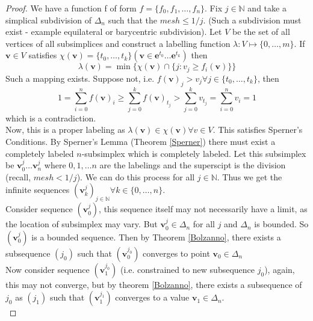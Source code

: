 \documentclass{article}
\theoremstyle{definition}
\begin{document}
\begin{proof}
We have a function f of form $f = \{f_0,f_1,\dots, f_n\}$. Fix $j \in \mathbb{N}$ and take a simplical subdivision of $\Delta_n$ such that the $mesh \leq 1/j$. (Such a subdivision must exist - example equilateral or barycentric subdivision). Let $V$ be the set of all vertices of all subsimplices and construct a labelling function $\lambda: V\mapsto \{0,\dots,m\}$. If $\mathbf{v} \in V$ satisfies $\chi(\mathbf{v}) = \{t_0,\dots, t_k\} (\mathbf{v} \in \mathbf{e}^{t_0}\dots \mathbf{e}^{t_k})$ then $$\lambda(\mathbf{v}) = \min\{\chi(\mathbf{v}) \cap \{j: v_j \geq f_i(\mathbf{v})\} \}$$ Such a mapping exists. Suppose not, i.e. $f(\mathbf{v})_j > v_j \forall j\in\{t_0,\dots, t_k\}$, then $$1 = \sum_{i=0}^n f(\mathbf{v})_i \geq \sum_{j=0}^k f(\mathbf{v})_{t_j} > \sum_{j=0}^k v_{t_j} = \sum_{i=0}^n v_i = 1$$ which is a contradiction.\\

Now, this is a proper labeling as $\lambda(\mathbf{v}) \in \chi(\mathbf{v}) \forall v\in V$. This satisfies Sperner's Conditions. By Sperner's Lemma (Theorem \ref{Sperner}) there must exist a completely labeled $n$-subsimplex which is completely labeled. Let this subsimplex be $\mathbf{v}^j_0 \dots \mathbf{v}^j_n$ where $0,1,\dots n$ are the labelings and the superscipt is the division (recall, $mesh<1/j$). We can do this process for all $j\in \mathbb{N}$. Thus we get the infinite sequences $(\mathbf{v}^j_k)_{j\in \mathbb{N}} \forall k\in \{0,\dots, n\}$.\\

Consider sequence $(\mathbf{v}^j_0)$, this sequence itself may not necessarily have a limit, as the location of subsimplex may vary. But $\mathbf{v}^j_0 \in \Delta_n$ for all $j$ and $\Delta_n$ is bounded. So $(\mathbf{v}^j_0)$ is a bounded sequence. Then by Theorem \ref{Bolzanno}, there exists a subsequence $(j_0)$ such that $(\mathbf{v}^{j_0}_0)$ converges to point $\mathbf{v}_0\in \Delta_n$\\

Now consider sequence $(\mathbf{v}^{j_0}_1)$ (i.e. constrained to new subsequence $j_0$), again, this may not converge, but by theorem \ref{Bolzanno}, there exists a subsequence of $j_0$ as $(j_1)$ such that $(\mathbf{v}^{j_1}_1)$ converges to a value $\mathbf{v}_1\in \Delta_n$.\\


\end{proof}
\end{document}
